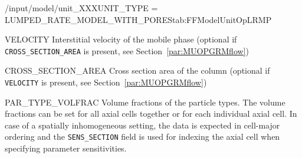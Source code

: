 \begin{condsubgroup}{/input/model/unit\_XXX}{UNIT\_TYPE = LUMPED\_RATE\_MODEL\_WITH\_PORES}{tab:FFModelUnitOpLRMP}
\begin{dataset}[unit=--,type=double,range={$(0, 1]
  \end{dataset}
  \begin{dataset}[unit=\si{\metre\per\second},type=double,range={$\mathds{R}$},length={1 / \texttt{NSEC}}]{VELOCITY}
    Interstitial velocity of the mobile phase (optional if \texttt{CROSS\_SECTION\_AREA} is present, see Section~\ref{par:MUOPGRMflow})
  \end{dataset}
  \begin{dataset}[unit=\si{\square\metre},type=double,range={$>0$},length={1}]{CROSS\_SECTION\_AREA}
    Cross section area of the column (optional if \texttt{VELOCITY} is present, see Section~\ref{par:MUOPGRMflow})
  \end{dataset}
  \begin{dataset}[unit=--,type=double,range={$[0,1]$},length={\texttt{NPARTYPE} / $\texttt{NCOL} \cdot \texttt{NPARTYPE}$}]{PAR\_TYPE\_VOLFRAC}
    Volume fractions of the particle types.
    The volume fractions can be set for all axial cells together or for each individual axial cell.
    In case of a spatially inhomogeneous setting, the data is expected in cell-major ordering and the \texttt{SENS\_SECTION} field is used for indexing the axial cell when specifying parameter sensitivities.
  \end{dataset}
\end{condsubgroup}

